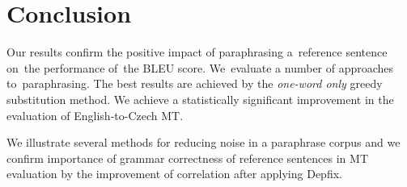 \section{Conclusion}
Our results confirm the positive impact of paraphrasing a~reference sentence 
on~the performance of~the BLEU score. We~evaluate a number of approaches 
to~paraphrasing. The best results are achieved by the \textit{one-word only} 
greedy substitution method. We achieve a statistically significant improvement 
in the evaluation of English-to-Czech MT. 

We illustrate several methods for reducing noise in a paraphrase corpus and
we confirm importance of grammar correctness of reference sentences in MT 
evaluation by the improvement of correlation after applying Depfix.


